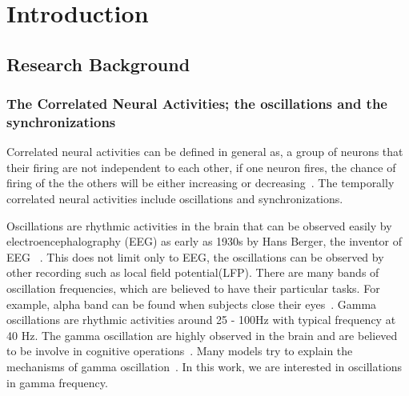 \chapter{Introduction}




\section{Research Background	}
\subsection{The Correlated Neural Activities; the oscillations and the synchronizations}

Correlated neural activities can be defined in general as, a group of neurons that their firing are not independent to each other, if one neuron fires, the chance of firing of the the others will be either increasing or decreasing~\cite{salinas2001correlated}. The temporally correlated neural activities include oscillations and synchronizations. 

Oscillations are rhythmic activities in the brain that can be observed easily by electroencephalography (EEG) as early as 1930s by Hans Berger, the inventor of EEG ~\cite{haas2003hans}. This does not limit only to EEG, the oscillations can be observed by other recording such as local field potential(LFP). 
There are many bands of oscillation frequencies, which are believed to have their particular tasks. For example, alpha band can be found when subjects close their eyes~\cite{buzsaki2004neuronal}. Gamma oscillations are rhythmic activities around 25 - 100Hz with typical frequency at 40 Hz. The gamma oscillation are highly observed in the brain and are believed to be involve in cognitive operations~\cite{singer1995visual, engel2001temporal, fries2005mechanism}. Many models try to explain the mechanisms of gamma oscillation~\cite{brunel2003determines,buzsaki2012mechanisms,gray1996chattering,wang1996gamma,whittington1995synchronized, wilson1972excitatory}. In this work, we are interested in oscillations in gamma frequency.

